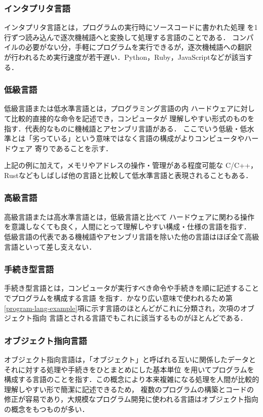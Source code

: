 \documentclass[autodetect-engine,dvi=dvipdfmx,ja=standard,a4j]{bxjsarticle}
\begin{document}
\subsubsection{インタプリタ言語}
インタプリタ言語とは，プログラムの実行時にソースコードに書かれた処理
を1行ずつ読み込んで逐次機械語へと変換して処理する言語のことである．
コンパイルの必要がない分，手軽にプログラムを実行できるが，逐次機械語への翻訳
が行われるため実行速度が若干遅い．Python，Ruby，JavaScriptなどが該当する．

\subsubsection{低級言語}
低級言語または低水準言語とは，プログラミング言語の内
ハードウェアに対して比較的直接的な命令を記述でき，コンピュータが
理解しやすい形式のものを指す．代表的なものに機械語とアセンブリ言語がある．
ここでいう低級・低水準とは「劣っている」という意味ではなく言語の構成がよりコンピュータやハードウェア
寄りであることを示す．

上記の例に加えて，メモリやアドレスの操作・管理がある程度可能な
C/C++，Rustなどもしばしば他の言語と比較して低水準言語と表現されることもある．

\subsubsection{高級言語}
高級言語または高水準言語とは，低級言語と比べて
ハードウェアに関わる操作を意識しなくても良く，人間にとって理解しやすい構成・仕様の言語を指す．
低級言語の代表である機械語やアセンブリ言語を除いた他の言語はほぼ全て高級言語といって差し支えない．

\subsubsection{手続き型言語}
手続き型言語とは，コンピュータが実行すべき命令や手続きを順に記述することでプログラムを構成する言語
を指す．かなり広い意味で使われるため第\ref{program-lang-example}項に示す言語のほとんどがこれに分類され，次項のオブジェクト指向
言語とされる言語でもこれに該当するものがほとんどである．

\subsubsection{オブジェクト指向言語}
オブジェクト指向言語は，「オブジェクト」と呼ばれる互いに関係したデータとそれに対する処理や手続きをひとまとめにした基本単位
を用いてプログラムを構成する言語のことを指す．この概念により本来複雑になる処理を人間が比較的理解しやすい形で簡潔に記述できるため，
複数のプログラムの構築とコードの修正が容易であり，大規模なプログラム開発に使われる言語はオブジェクト指向の概念をもつものが多い．
\end{document}
